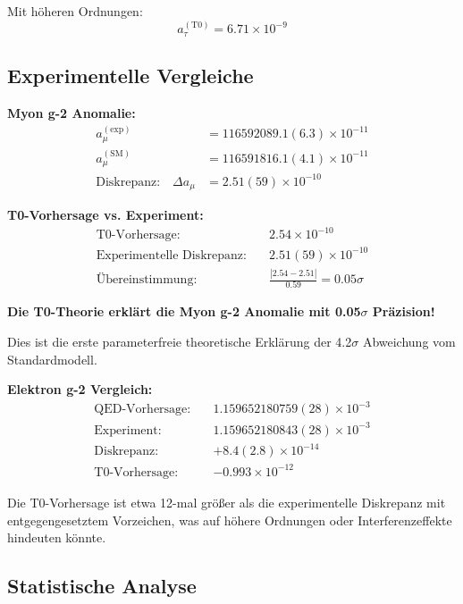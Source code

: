 \documentclass[12pt,a4paper]{article}
\begin{document}
Mit höheren Ordnungen:
\begin{equation}
	\boxed{a_\tau^{(\text{T0})} = 6.71 \times 10^{-9}}
\end{equation}

\subsection{Experimentelle Vergleiche}

\textbf{Myon g-2 Anomalie:}
\begin{align}
	a_\mu^{(\text{exp})} &= 116592089.1(6.3) \times 10^{-11}\\
	a_\mu^{(\text{SM})} &= 116591816.1(4.1) \times 10^{-11}\\
	\text{Diskrepanz:} \quad \Delta a_\mu &= 2.51(59) \times 10^{-10}
\end{align}

\textbf{T0-Vorhersage vs. Experiment:}
\begin{align}
	\text{T0-Vorhersage:} \quad &2.54 \times 10^{-10}\\
	\text{Experimentelle Diskrepanz:} \quad &2.51(59) \times 10^{-10}\\
	\text{Übereinstimmung:} \quad &\frac{|2.54 - 2.51|}{0.59} = 0.05\sigma
\end{align}


	\textbf{Die T0-Theorie erklärt die Myon g-2 Anomalie mit 0.05$\sigma$ Präzision!}
	
	Dies ist die erste parameterfreie theoretische Erklärung der 4.2$\sigma$ Abweichung vom Standardmodell.


\textbf{Elektron g-2 Vergleich:}
\begin{align}
	\text{QED-Vorhersage:} \quad &1.159652180759(28) \times 10^{-3}\\
	\text{Experiment:} \quad &1.159652180843(28) \times 10^{-3}\\
	\text{Diskrepanz:} \quad &+8.4(2.8) \times 10^{-14}\\
	\text{T0-Vorhersage:} \quad &-0.993 \times 10^{-12}
\end{align}

Die T0-Vorhersage ist etwa 12-mal größer als die experimentelle Diskrepanz mit entgegengesetztem Vorzeichen, was auf höhere Ordnungen oder Interferenzeffekte hindeuten könnte.

\subsection{Statistische Analyse}
\end{document}
